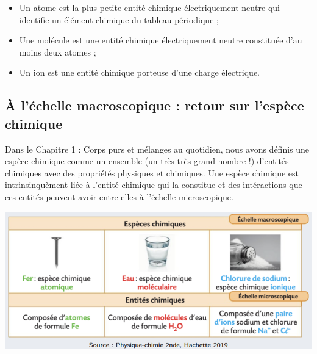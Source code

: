 \begin{tcolorbox}[colback=green!5!white,colframe=green!75!black,title=\textbf{Définitions :}]
\begin{itemize}[label=\textbullet, font=\large]
    \item Un atome est la plus petite entité chimique électriquement neutre qui identifie un élément chimique du tableau périodique ;
    \item Une molécule est une entité chimique électriquement neutre constituée d'au moins deux atomes ;
    \item Un ion est une entité chimique porteuse d'une charge électrique. 
\end{itemize}

\end{tcolorbox}

\subsection{\`{A} l'échelle macroscopique : retour sur l'espèce chimique}
Dans le Chapitre 1 : Corps purs et mélanges au quotidien, nous avons définis une espèce chimique comme un ensemble (un très très grand nombre !) d'entités chimiques avec des propriétés physiques et chimiques. Une espèce chimique est intrinsinquèment liée à l'entité chimique qui la constitue et des intéractions que ces entités peuvent avoir entre elles à l'échelle microscopique.

\begin{center}
    \includegraphics[scale=1]{Images/MicroVSMacro.png}
\end{center}
